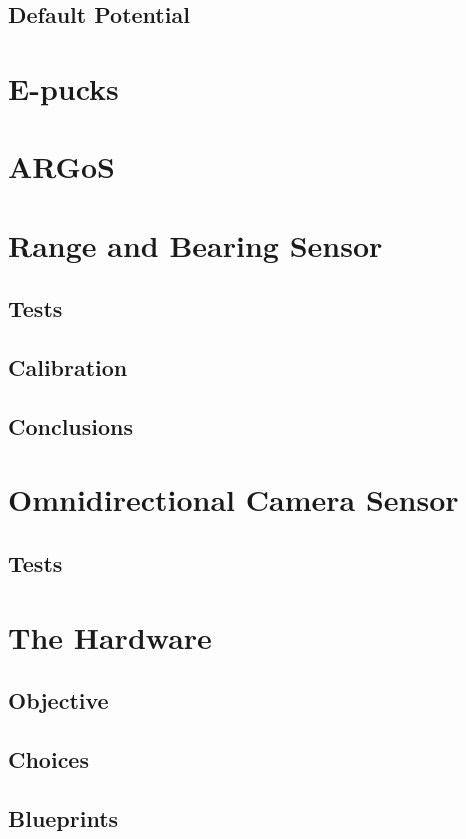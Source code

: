 \documentclass[a4paper, 12pt]{report}
\begin{document}
		\subsection{Default Potential}
		
	\section{E-pucks}
	
	\section{ARGoS}
	
	\section{Range and Bearing Sensor}
		\subsection{Tests}
		\subsection{Calibration}
		\subsection{Conclusions}

	\section{Omnidirectional Camera Sensor}
		\subsection{Tests}

	\section{The Hardware}
		\subsection{Objective}
		\subsection{Choices}
		\subsection{Blueprints}
\end{document}
